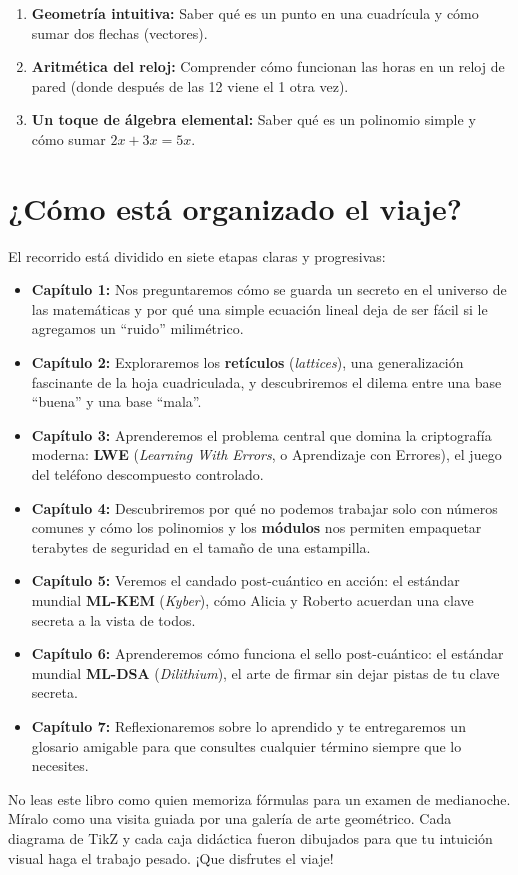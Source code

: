 \begin{enumerate}
  \item \textbf{Geometría intuitiva:} Saber qué es un punto en una cuadrícula y cómo sumar dos flechas (vectores).
  \item \textbf{Aritmética del reloj:} Comprender cómo funcionan las horas en un reloj de pared (donde después de las 12 viene el 1 otra vez).
  \item \textbf{Un toque de álgebra elemental:} Saber qué es un polinomio simple y cómo sumar $2x + 3x = 5x$.
\end{enumerate}

\section*{¿Cómo está organizado el viaje?}

El recorrido está dividido en siete etapas claras y progresivas:

\begin{itemize}
  \item \textbf{Capítulo 1:} Nos preguntaremos cómo se guarda un secreto en el universo de las matemáticas y por qué una simple ecuación lineal deja de ser fácil si le agregamos un ``ruido'' milimétrico.
  \item \textbf{Capítulo 2:} Exploraremos los \textbf{retículos} (\textit{lattices}), una generalización fascinante de la hoja cuadriculada, y descubriremos el dilema entre una base ``buena'' y una base ``mala''.
  \item \textbf{Capítulo 3:} Aprenderemos el problema central que domina la criptografía moderna: \textbf{LWE} (\textit{Learning With Errors}, o Aprendizaje con Errores), el juego del teléfono descompuesto controlado.
  \item \textbf{Capítulo 4:} Descubriremos por qué no podemos trabajar solo con números comunes y cómo los polinomios y los \textbf{módulos} nos permiten empaquetar terabytes de seguridad en el tamaño de una estampilla.
  \item \textbf{Capítulo 5:} Veremos el candado post-cuántico en acción: el estándar mundial \textbf{ML-KEM} (\textit{Kyber}), cómo Alicia y Roberto acuerdan una clave secreta a la vista de todos.
  \item \textbf{Capítulo 6:} Aprenderemos cómo funciona el sello post-cuántico: el estándar mundial \textbf{ML-DSA} (\textit{Dilithium}), el arte de firmar sin dejar pistas de tu clave secreta.
  \item \textbf{Capítulo 7:} Reflexionaremos sobre lo aprendido y te entregaremos un glosario amigable para que consultes cualquier término siempre que lo necesites.
\end{itemize}

\begin{intuicion}
No leas este libro como quien memoriza fórmulas para un examen de medianoche. Míralo como una visita guiada por una galería de arte geométrico. Cada diagrama de TikZ y cada caja didáctica fueron dibujados para que tu intuición visual haga el trabajo pesado. ¡Que disfrutes el viaje!
\end{intuicion}
